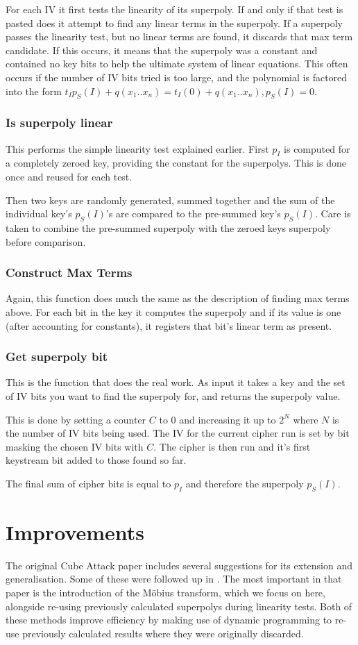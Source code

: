 \documentclass{report}
\let\Oldsection\section
\renewcommand{\section}{\FloatBarrier\Oldsection}
\let\Oldsubsubsection\subsubsection
\renewcommand{\subsubsection}{\FloatBarrier\Oldsubsubsection}
\begin{document}
For each IV it first tests the linearity of its superpoly. If and only if that test is pasted does it attempt to find any linear terms in the superpoly. If a superpoly passes the linearity test, but no linear terms are found, it discards that max term candidate. If this occurs, it means that the superpoly was a constant and contained no key bits to help the ultimate system of linear equations. This often occurs if the number of IV bits tried is too large, and the polynomial is factored into the form $t_Ip_S(I)+q(x_1..x_n)=t_I(0)+q(x_1..x_n), p_S(I)=0$.

\subsubsection{Is superpoly linear}
This performs the simple linearity test explained earlier. First $p_I$ is computed for a completely zeroed key, providing the constant for the superpolys. This is done once and reused for each test.

Then two keys are randomly generated, summed together and the sum of the individual key's $p_S(I)$'s are compared to the pre-summed key's $p_S(I)$. Care is taken to combine the pre-summed superpoly with the zeroed keys superpoly before comparison.
\subsubsection{Construct Max Terms}
Again, this function does much the same as the description of finding max terms above. For each bit in the key it computes the superpoly and if its value is one (after accounting for constants), it registers that bit's linear term as present.
\subsubsection{Get superpoly bit}
This is the function that does the real work. As input it takes a key and the set of IV bits you want to find the superpoly for, and returns the superpoly value.

This is done by setting a counter $C$ to 0 and increasing it up to $2^N$ where $N$ is the number of IV bits being used. The IV for the current cipher run is set by bit masking the chosen IV bits with $C$. The cipher is then run and it's first keystream bit added to those found so far.

The final sum of cipher bits is equal to $p_I$ and therefore the superpoly $p_S(I)$.
\section{Improvements}
The original Cube Attack paper includes several suggestions for its extension and generalisation. Some of these were followed up in \cite{MobiusTransform}. The most important in that paper is the introduction of the M\"{o}bius transform, which we focus on here, alongside re-using previously calculated superpolys during linearity tests. Both of these methods improve efficiency by making use of dynamic programming to re-use previously calculated results where they were originally discarded.
\end{document}
